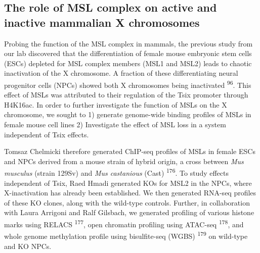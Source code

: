 \documentclass[11pt,twoside]{MPIthesis}
\theoremstyle{definition}
\theoremstyle{definition}
\theoremstyle{definition}
\theoremstyle{remark}
\begin{document}
\subsection{The role of MSL complex on active and inactive mammalian X
chromosomes}\label{the-role-of-msl-complex-on-active-and-inactive-mammalian-x-chromosomes}

Probing the function of the MSL complex in mammals, the previous study
from our lab discovered that the differentiation of female mouse
embryonic stem cells (ESCs) depleted for MSL complex members (MSL1 and
MSL2) leads to chaotic inactivation of the X chromosome. A fraction of
these differentiating neural progenitor cells (NPCs) showed both X
chromosomes being inactivated \textsuperscript{96}. This effect of MSLs
was attributed to their regulation of the Tsix promoter through H4K16ac.
In order to further investigate the function of MSLs on the X
chromosome, we sought to 1) generate genome-wide binding profiles of
MSLs in female mouse cell lines 2) Investigate the effect of MSL loss in
a system independent of Tsix effects.

Tomsaz Chelmicki therefore generated ChIP-seq profiles of MSLs in female
ESCs and NPCs derived from a mouse strain of hybrid origin, a cross
between \emph{Mus musculus} (strain 129Sv) and \emph{Mus castanious}
(Cast) \textsuperscript{176}. To study effects independent of Tsix, Raed
Hmadi generated KOs for MSL2 in the NPCs, where X-inactivation has
already been established. We then generated RNA-seq profiles of these KO
clones, along with the wild-type controls. Further, in collaboration
with Laura Arrigoni and Ralf Gilsbach, we generated profiling of various
histone marks using RELACS \textsuperscript{177}, open chromatin
profiling using ATAC-seq \textsuperscript{178}, and whole genome
methylation profile using bisulfite-seq (WGBS) \textsuperscript{179} on
wild-type and KO NPCs.
\end{document}
